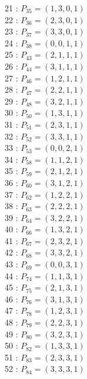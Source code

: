 \documentclass{article}
\begin{document}
{\begin{multicols}{3}
21 : $P_{35}=( 1, 3, 0, 1 )$\\
22 : $P_{36}=( 2, 3, 0, 1 )$\\
23 : $P_{37}=( 3, 3, 0, 1 )$\\
24 : $P_{38}=( 0, 0, 1, 1 )$\\
25 : $P_{43}=( 2, 1, 1, 1 )$\\
26 : $P_{44}=( 3, 1, 1, 1 )$\\
27 : $P_{46}=( 1, 2, 1, 1 )$\\
28 : $P_{47}=( 2, 2, 1, 1 )$\\
29 : $P_{48}=( 3, 2, 1, 1 )$\\
30 : $P_{50}=( 1, 3, 1, 1 )$\\
31 : $P_{51}=( 2, 3, 1, 1 )$\\
32 : $P_{52}=( 3, 3, 1, 1 )$\\
33 : $P_{53}=( 0, 0, 2, 1 )$\\
34 : $P_{58}=( 1, 1, 2, 1 )$\\
35 : $P_{59}=( 2, 1, 2, 1 )$\\
36 : $P_{60}=( 3, 1, 2, 1 )$\\
37 : $P_{62}=( 1, 2, 2, 1 )$\\
38 : $P_{63}=( 2, 2, 2, 1 )$\\
39 : $P_{64}=( 3, 2, 2, 1 )$\\
40 : $P_{66}=( 1, 3, 2, 1 )$\\
41 : $P_{67}=( 2, 3, 2, 1 )$\\
42 : $P_{68}=( 3, 3, 2, 1 )$\\
43 : $P_{69}=( 0, 0, 3, 1 )$\\
44 : $P_{74}=( 1, 1, 3, 1 )$\\
45 : $P_{75}=( 2, 1, 3, 1 )$\\
46 : $P_{76}=( 3, 1, 3, 1 )$\\
47 : $P_{78}=( 1, 2, 3, 1 )$\\
48 : $P_{79}=( 2, 2, 3, 1 )$\\
49 : $P_{80}=( 3, 2, 3, 1 )$\\
50 : $P_{82}=( 1, 3, 3, 1 )$\\
51 : $P_{83}=( 2, 3, 3, 1 )$\\
52 : $P_{84}=( 3, 3, 3, 1 )$\\
\end{multicols}


%


%


}%
\end{document}
